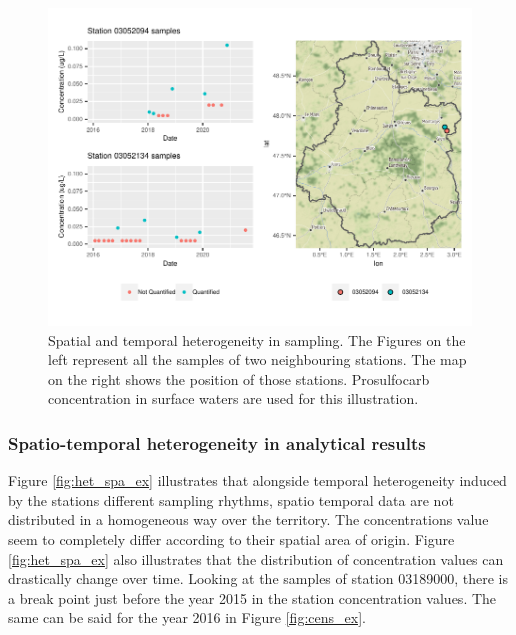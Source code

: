 \begin{figure}[htbp]
    \centering
    \includegraphics{figs/Chap3/Hetero_ex.pdf}
    \caption{Spatial and temporal heterogeneity in sampling. The Figures on the left represent all the samples of two neighbouring stations. The map on the right shows the position of those stations. Prosulfocarb concentration in surface waters are used for this illustration.}
    \label{fig:het_samp_ex}
\end{figure}

\subsubsection{Spatio-temporal heterogeneity in analytical results}

Figure \ref{fig:het_spa_ex} illustrates that alongside temporal heterogeneity induced by the stations different sampling rhythms, spatio temporal data are not distributed in a homogeneous way over the territory. The concentrations value seem to completely differ according to their spatial area of origin. Figure \ref{fig:het_spa_ex} also illustrates that the distribution of concentration values can drastically change over time. Looking at the samples of station 03189000, there is a break point just before the year 2015 in the station concentration values. The same can be said for the year 2016 in Figure \ref{fig:cens_ex}. 

